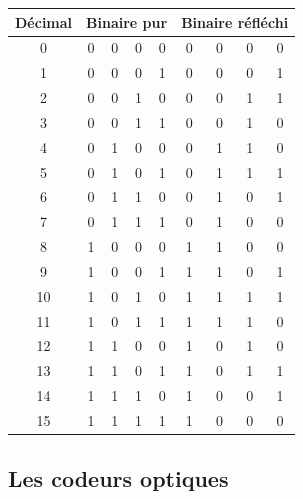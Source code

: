 \begin{minipage}[c]{.4\linewidth}
\begin{center}
\begin{tabular}{|c|cccc|cccc|}
\hline
Décimal & \multicolumn{4}{c|}{Binaire pur} &\multicolumn{4}{c|}{Binaire réfléchi} \\
\hline
\hline
0 & 0 & 0 & 0 & 0 & 0 & 0 & 0 & 0 \\ \hline
1 & 0 & 0 & 0 & 1 & 0 & 0 & 0 & 1 \\ \hline\hline
2 & 0 & 0 & 1 & 0 & 0 & 0 & 1 & 1 \\ \hline
3 & 0 & 0 & 1 & 1 & 0 & 0 & 1 & 0 \\ \hline\hline
4 & 0 & 1 & 0 & 0 & 0 & 1 & 1 & 0 \\ \hline
5 & 0 & 1 & 0 & 1 & 0 & 1 & 1 & 1 \\ \hline
6 & 0 & 1 & 1 & 0 & 0 & 1 & 0 & 1 \\ \hline
7 & 0 & 1 & 1 & 1 & 0 & 1 & 0 & 0 \\ \hline\hline
8 & 1 & 0 & 0 & 0 & 1 & 1 & 0 & 0 \\ \hline
9 & 1 & 0 & 0 & 1 & 1 & 1 & 0 & 1 \\ \hline
10 & 1 & 0 & 1 & 0 & 1 & 1 & 1 & 1 \\ \hline
11 & 1 & 0 & 1 & 1 & 1 & 1 & 1 & 0 \\ \hline
12 & 1 & 1 & 0 & 0 & 1 & 0 & 1 & 0 \\ \hline
13 & 1 & 1 & 0 & 1 & 1 & 0 & 1 & 1 \\ \hline
14 & 1 & 1 & 1 & 0 & 1 & 0 & 0 & 1 \\ \hline
15 & 1 & 1 & 1 & 1 & 1 & 0 & 0 & 0 \\ \hline
\end{tabular}
\end{center}
\end{minipage}

\subsection{Les codeurs optiques}
